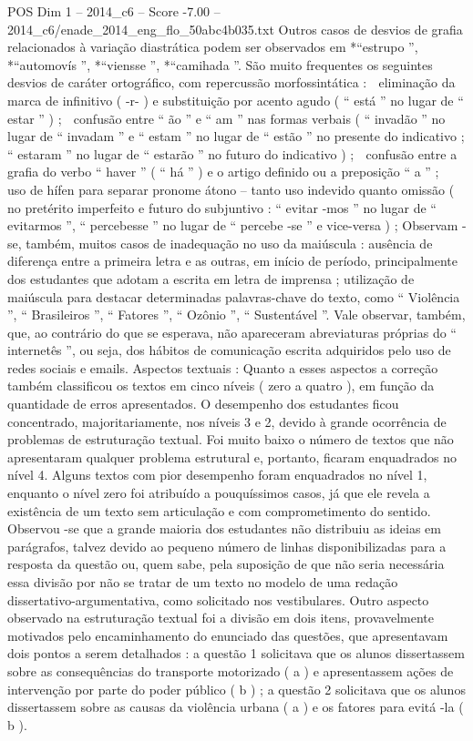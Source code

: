 \begin{textsample}{POS Dim 1 – 2014\_c6 – Score -7.00 – 2014\_c6/enade\_2014\_eng\_flo\_50abc4b035.txt}
Outros casos de desvios de grafia relacionados à variação diastrática podem ser observados em *“estrupo ”, *“automovís ”, *“viensse ”, *“camihada ”.
São muito frequentes os seguintes desvios de caráter ortográfico, com repercussão morfossintática :  eliminação da marca de infinitivo ( -r- ) e substituição por acento agudo ( “ está ” no lugar de “ estar ” ) ;  confusão entre “ ão ” e “ am ” nas formas verbais ( “ invadão ” no lugar de “ invadam ” e “ estam ” no lugar de “ estão ” no presente do indicativo ; “ estaram ” no lugar de “ estarão ” no futuro do indicativo ) ;  confusão entre a grafia do verbo “ haver ” ( “ há ” ) e o artigo definido ou a preposição “ a ” ;  uso de hífen para separar pronome átono – tanto uso indevido quanto omissão ( no pretérito imperfeito e futuro do subjuntivo : “ evitar -mos ” no lugar de “ evitarmos ”, “ percebesse ” no lugar de “ percebe -se ” e vice-versa ) ; Observam -se, também, muitos casos de inadequação no uso da maiúscula : ausência de diferença entre a primeira letra e as outras, em início de período, principalmente dos estudantes que adotam a escrita em letra de imprensa ; utilização de maiúscula para destacar determinadas palavras-chave do texto, como “ Violência ”, “ Brasileiros ”, “ Fatores ”, “ Ozônio ”, “ Sustentável ”.
Vale observar, também, que, ao contrário do que se esperava, não apareceram abreviaturas próprias do “ internetês ”, ou seja, dos hábitos de comunicação escrita adquiridos pelo uso de redes sociais e emails.
Aspectos textuais : Quanto a esses aspectos a correção também classificou os textos em cinco níveis ( zero a quatro ), em função da quantidade de erros apresentados.
O desempenho dos estudantes ficou concentrado, majoritariamente, nos níveis 3 e 2, devido à grande ocorrência de problemas de estruturação textual.
Foi muito baixo o número de textos que não apresentaram qualquer problema estrutural e, portanto, ficaram enquadrados no nível 4.
Alguns textos com pior desempenho foram enquadrados no nível 1, enquanto o nível zero foi atribuído a pouquíssimos casos, já que ele revela a existência de um texto sem articulação e com comprometimento do sentido.
Observou -se que a grande maioria dos estudantes não distribuiu as ideias em parágrafos, talvez devido ao pequeno número de linhas disponibilizadas para a resposta da questão ou, quem sabe, pela suposição de que não seria necessária essa divisão por não se tratar de um texto no modelo de uma redação dissertativo-argumentativa, como solicitado nos vestibulares.
Outro aspecto observado na estruturação textual foi a divisão em dois itens, provavelmente motivados pelo encaminhamento do enunciado das questões, que apresentavam dois pontos a serem detalhados : a questão 1 solicitava que os alunos dissertassem sobre as consequências do transporte motorizado ( a ) e apresentassem ações de intervenção por parte do poder público ( b ) ; a questão 2 solicitava que os alunos dissertassem sobre as causas da violência urbana ( a ) e os fatores para evitá -la ( b ).

\end{textsample}
